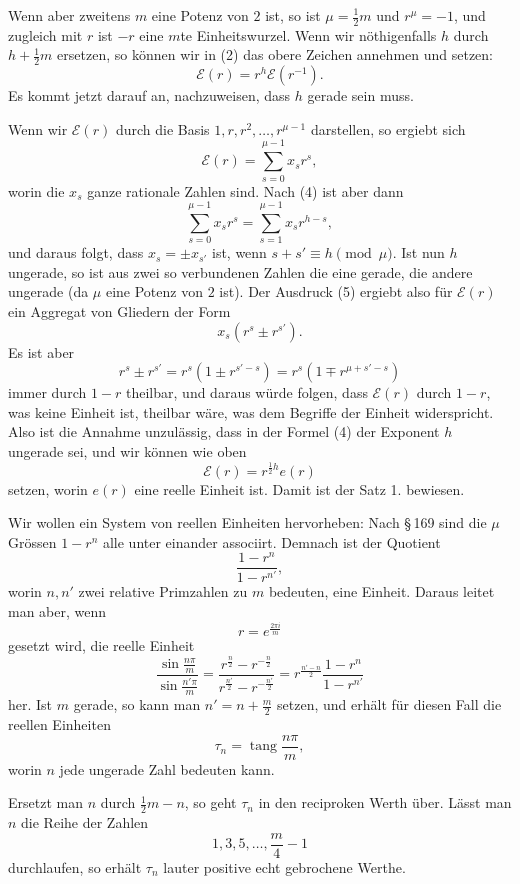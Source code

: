 \documentclass[11pt]{article}
\begin{document}
Wenn aber zweitens $m$ eine Potenz von $2$ ist, so ist $\mu=\frac12m$ und $r^\mu=-1$, und zugleich mit $r$ ist $-r$ eine $m$te Einheitswurzel. Wenn wir nöthigenfalls $h$ durch $h+\frac12m$ ersetzen, so können wir in (2) das obere Zeichen annehmen und setzen:
\begin{equation}
\mathscr E(r)=r^h\mathscr E(r^{-1}).
\tag{4}
\end{equation}
Es kommt jetzt darauf an, nachzuweisen, dass $h$ gerade sein muss.

Wenn wir $\mathscr E(r)$ durch die Basis $1,r,r^2,\ldots,r^{\mu-1}$ darstellen, so ergiebt sich
\begin{equation}
\mathscr E(r)=\sum_{s=0}^{\mu-1}x_sr^s,
\tag{5}
\end{equation}
worin die $x_s$ ganze rationale Zahlen sind. Nach (4) ist aber dann
\[
\sum_{s=0}^{\mu-1}x_sr^s=\sum_{s=1}^{\mu-1}x_sr^{h-s},
\]
und daraus folgt, dass $x_s=\pm x_{s'}$ ist, wenn $s+s'\equiv h\pmod\mu$. Ist nun $h$ ungerade, so ist aus zwei so verbundenen Zahlen die eine gerade, die andere ungerade (da $\mu$ eine Potenz von $2$ ist). Der Ausdruck (5) ergiebt also für $\mathscr E(r)$ ein Aggregat von Gliedern der Form
\[
x_s(r^s\pm r^{s'}).
\]
Es ist aber
\[
r^s\pm r^{s'}=r^s(1\pm r^{s'-s})=r^s(1\mp r^{\mu+s'-s})
\]
immer durch $1-r$ theilbar, und daraus würde folgen, dass $\mathscr E(r)$ durch $1-r$, was keine Einheit ist, theilbar wäre, was dem Begriffe der Einheit widerspricht. Also ist die Annahme unzulässig, dass in der Formel (4) der Exponent $h$ ungerade sei, und wir können wie oben
\[
\mathscr E(r)=r^{\frac12h}e(r)
\]
setzen, worin $e(r)$ eine reelle Einheit ist. Damit ist der Satz 1. bewiesen.

Wir wollen ein System von reellen Einheiten hervorheben: Nach \S\,169 sind die $\mu$ Grössen $1-r^n$ alle unter einander associirt. Demnach ist der Quotient
\[
\frac{1-r^n}{1-r^{n'}},
\]
worin $n,n'$ zwei relative Primzahlen zu $m$ bedeuten, eine Einheit. Daraus leitet man aber, wenn
\[
r=e^{\frac{2\pi i}{m}}
\]
gesetzt wird, die reelle Einheit
\begin{equation}
\frac{\sin\frac{n\pi}{m}}{\sin\frac{n'\pi}{m}}
=\frac{r^{\frac n2}-r^{-\frac n2}}{r^{\frac{n'}2}-r^{-\frac{n'}2}}
=r^{\frac{n'-n}{2}}\frac{1-r^n}{1-r^{n'}}
\tag{6}
\end{equation}
her. Ist $m$ gerade, so kann man $n'=n+\frac m2$ setzen, und erhält für diesen Fall die reellen Einheiten
\begin{equation}
\tau_n=\operatorname{tang}\frac{n\pi}{m},
\tag{7}
\end{equation}
worin $n$ jede ungerade Zahl bedeuten kann.

Ersetzt man $n$ durch $\frac12m-n$, so geht $\tau_n$ in den reciproken Werth über. Lässt man $n$ die Reihe der Zahlen
\[
1,3,5,\ldots,\frac m4-1
\]
durchlaufen, so erhält $\tau_n$ lauter positive echt gebrochene Werthe.
\end{document}
